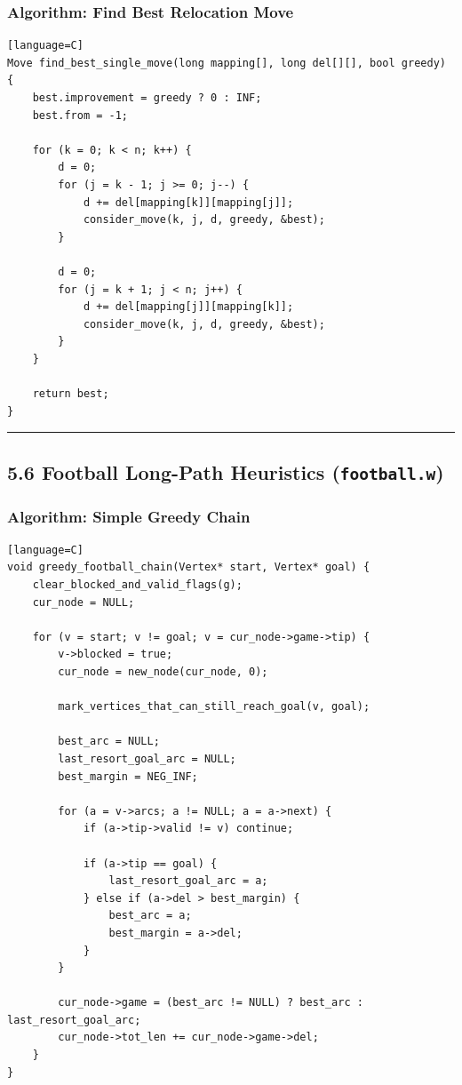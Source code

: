 \documentclass[11pt]{article}
\begin{document}
\subsubsection{Algorithm: Find Best Relocation Move}\label{algorithm-find-best-relocation-move}

\begin{verbatim}[language=C]
Move find_best_single_move(long mapping[], long del[][], bool greedy) {
    best.improvement = greedy ? 0 : INF;
    best.from = -1;

    for (k = 0; k < n; k++) {
        d = 0;
        for (j = k - 1; j >= 0; j--) {
            d += del[mapping[k]][mapping[j]];
            consider_move(k, j, d, greedy, &best);
        }

        d = 0;
        for (j = k + 1; j < n; j++) {
            d += del[mapping[j]][mapping[k]];
            consider_move(k, j, d, greedy, &best);
        }
    }

    return best;
}
\end{verbatim}

\begin{center}\rule{0.5\linewidth}{0.5pt}\end{center}

\subsection{\texorpdfstring{5.6 Football Long-Path Heuristics (\texttt{football.w})}{5.6 Football Long-Path Heuristics (football.w)}}\label{football-long-path-heuristics-football.w}

\subsubsection{Algorithm: Simple Greedy Chain}\label{algorithm-simple-greedy-chain}

\begin{verbatim}[language=C]
void greedy_football_chain(Vertex* start, Vertex* goal) {
    clear_blocked_and_valid_flags(g);
    cur_node = NULL;

    for (v = start; v != goal; v = cur_node->game->tip) {
        v->blocked = true;
        cur_node = new_node(cur_node, 0);

        mark_vertices_that_can_still_reach_goal(v, goal);

        best_arc = NULL;
        last_resort_goal_arc = NULL;
        best_margin = NEG_INF;

        for (a = v->arcs; a != NULL; a = a->next) {
            if (a->tip->valid != v) continue;

            if (a->tip == goal) {
                last_resort_goal_arc = a;
            } else if (a->del > best_margin) {
                best_arc = a;
                best_margin = a->del;
            }
        }

        cur_node->game = (best_arc != NULL) ? best_arc : last_resort_goal_arc;
        cur_node->tot_len += cur_node->game->del;
    }
}
\end{verbatim}
\end{document}
